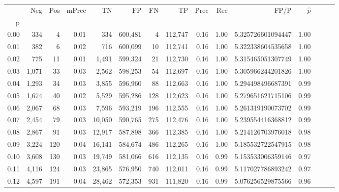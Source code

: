 \begin{tabular}{rrrrrrrrrrrrrrr}
\toprule
{} &     Neg &    Pos & mPrec &       TN &       FP &       FN &       TP &  Prec &   Rec &                   FP/P & $\hat{p}$ \\
p    &         &        &       &          &          &          &          &       &       &                        &           \\
\midrule
0.00 &     334 &      4 &  0.01 &      334 &  600,481 &        4 &  112,747 &  0.16 &  1.00 &      5.325726601094447 &      1.00 \\
0.01 &     382 &      6 &  0.02 &      716 &  600,099 &       10 &  112,741 &  0.16 &  1.00 &      5.322338604535658 &      1.00 \\
0.02 &     775 &     11 &  0.01 &    1,491 &  599,324 &       21 &  112,730 &  0.16 &  1.00 &      5.315465051307749 &      1.00 \\
0.03 &   1,071 &     33 &  0.03 &    2,562 &  598,253 &       54 &  112,697 &  0.16 &  1.00 &      5.305966244201826 &      1.00 \\
0.04 &   1,293 &     34 &  0.03 &    3,855 &  596,960 &       88 &  112,663 &  0.16 &  1.00 &      5.294498496687391 &      0.99 \\
0.05 &   1,674 &     40 &  0.02 &    5,529 &  595,286 &      128 &  112,623 &  0.16 &  1.00 &      5.279651621715106 &      0.99 \\
0.06 &   2,067 &     68 &  0.03 &    7,596 &  593,219 &      196 &  112,555 &  0.16 &  1.00 &      5.261319190073702 &      0.99 \\
0.07 &   2,454 &     79 &  0.03 &   10,050 &  590,765 &      275 &  112,476 &  0.16 &  1.00 &      5.239554416368812 &      0.99 \\
0.08 &   2,867 &     91 &  0.03 &   12,917 &  587,898 &      366 &  112,385 &  0.16 &  1.00 &      5.214126703976018 &      0.98 \\
0.09 &   3,224 &    120 &  0.04 &   16,141 &  584,674 &      486 &  112,265 &  0.16 &  1.00 &      5.185532722547915 &      0.98 \\
0.10 &   3,608 &    130 &  0.03 &   19,749 &  581,066 &      616 &  112,135 &  0.16 &  0.99 &      5.153533006359146 &      0.97 \\
0.11 &   4,116 &    124 &  0.03 &   23,865 &  576,950 &      740 &  112,011 &  0.16 &  0.99 &      5.117027786893242 &      0.97 \\
0.12 &   4,597 &    191 &  0.04 &   28,462 &  572,353 &      931 &  111,820 &  0.16 &  0.99 &      5.076256529875566 &      0.96 \\

\end{tabular}
